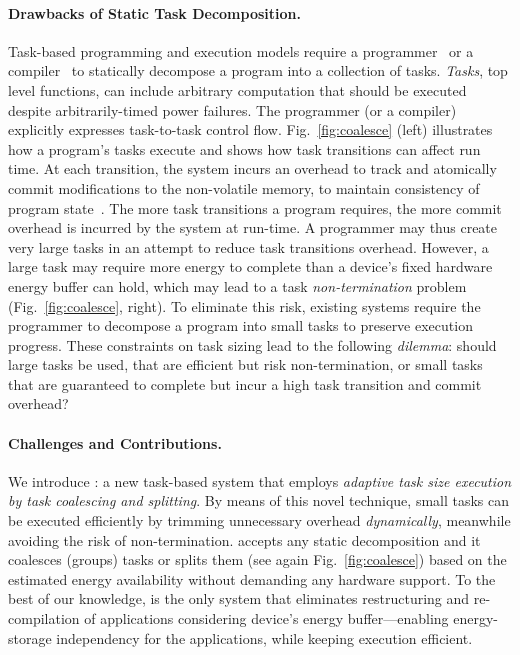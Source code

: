 \paragraph{Drawbacks of Static Task Decomposition.}
Task-based programming and execution models require a programmer~\cite{alpaca,chain} or a compiler~\cite{baghsorkhi_cgo_2018} to statically decompose a program into a collection of tasks. \emph{Tasks}, top level functions, can include arbitrary computation that should be executed despite arbitrarily-timed power failures. The programmer (or a compiler) explicitly expresses task-to-task control flow. Fig.~\ref{fig:coalesce} (left) illustrates how a program's tasks execute and shows how task transitions can affect run time. At each transition, the system incurs an overhead to track and atomically commit modifications to the non-volatile memory, to maintain consistency of program state~\cite{chain,alpaca}. The more task transitions a program requires, the more commit overhead is incurred by the system at run-time. A programmer may thus create very large tasks in an attempt to reduce task transitions overhead. However, a large task may require more energy to complete than a device's fixed hardware energy buffer can hold, which may lead to a task \emph{non-termination} problem (Fig.~\ref{fig:coalesce}, right). To eliminate this risk, existing systems require the programmer to decompose a program into small tasks to preserve execution progress. These constraints on task sizing lead to the following \emph{dilemma}: should large tasks be used, that are efficient but risk non-termination, or small tasks that are guaranteed to complete but incur a high task transition and commit overhead?

\paragraph{Challenges and Contributions.}
We introduce \sys: a new task-based system that employs \emph{adaptive task size execution by task coalescing and splitting}. By means of this novel technique, small tasks can be executed efficiently by trimming unnecessary overhead \emph{dynamically}, meanwhile avoiding the risk of non-termination. \sys accepts any static decomposition and it coalesces (groups) tasks or splits them (see again Fig.~\ref{fig:coalesce}) based on the estimated energy availability without demanding any hardware support. To the best of our knowledge, \sys is the only system that eliminates restructuring and re-compilation of applications considering device's energy buffer---enabling energy-storage independency for the applications, while keeping execution efficient.

